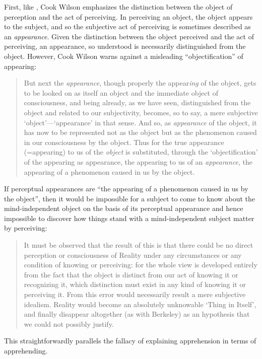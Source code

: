 \documentclass[11pt]{article}
\begin{document}
First, like \citet{Moore:1903uo}, Cook Wilson emphasizes the distinction between the object of perception and the act of perceiving. In perceiving an object, the object appears to the subject, and so the subjective act of perceiving is sometimes described as an \emph{appearance}. Given the distinction between the object perceived and the act of perceiving, an appearance, so understood is necessarily distinguished from the object. However, Cook Wilson warns against a misleading ``objectification'' of appearing:
\begin{quote}
	But next the \emph{appearance}, though properly the appear\emph{ing} of the object, gets to be looked on as itself an object and the immediate object of consciousness, and being already, as we have seen, distinguished from the object and related to our subjectivity, becomes, so to say, a mere subjective `object'---`appearance' in that sense. And so, as \emph{appearance} of the object, it has now to be represented not as the object but as the phenomenon caused in our consciousness by the object. Thus for the true appearance (=appearing) to us of the \emph{object} is substituted, through the `objectification' of the appearing as appearance, the appearing to us of an \emph{appearance}, the appearing of a phenomenon caused in us by the object.  \citep[796]{Cook-Wilson:1926sf}
\end{quote}

If perceptual appearances are ``the appearing of a phenomenon caused in us by the object'', then it would be impossible for a subject to come to know about the mind-independent object on the basis of its perceptual appearance and hence impossible to discover how things stand with a mind-independent subject matter by perceiving:
\begin{quote}
	It must be observed that the result of this is that there could be no direct perception or consciousness of Reality under any circumstances or any condition of knowing or perceiving: for the whole view is developed entirely from the fact that the object is distinct from our act of knowing it or recognizing it, which distinction must exist in any kind of knowing it or perceiving it. From this error would necessarily result a mere subjective idealism. Reality would become an absolutely unknowable `Thing in Itself', and finally disappear altogether (as with Berkeley) as an hypothesis that we could not possibly justify. \citep[797]{Cook-Wilson:1926sf}
\end{quote}
This straightforwardly parallels the fallacy of explaining apprehension in terms of apprehending. 
\end{document}
